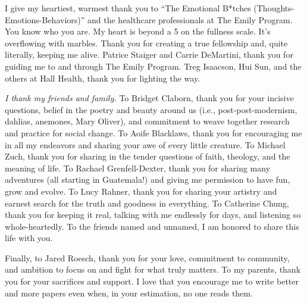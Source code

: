 I give my heartiest, warmest thank you to ``The Emotional B*tches
(Thoughts-Emotions-Behaviors)'' and the healthcare professionals at The Emily Program. You know who you are. 
My heart is beyond a 5 on the fullness scale. It's overflowing with marbles.
Thank you for creating a true fellowship and, quite literally, keeping me
alive. Patrice Staiger and Carrie DeMartini, thank you for guiding me to and
through The Emily Program. Treg Isaacson, Hui Sun, and the others 
at Hall Health, thank you for lighting the way.

\textit{I thank my friends and family.} To Bridget Claborn, thank you for your
incisive questions, belief in the poetry and beauty around us
(i.e., post-post-modernism, dahlias, anemones, Mary Oliver), and commitment to weave together research and practice for social change. %
To Aoife Blacklaws, thank you for encouraging me in all my endeavors and sharing
your awe of every little creature. To Michael Zuch, thank you for sharing in the
tender questions of faith, theology, and the meaning of life. To Rachael
Grenfell-Dexter, thank you for sharing many adventures (all starting in
Guatemala!) and giving me permission to have fun, grow and evolve. To Lucy
Rahner, thank you for sharing your artistry and earnest search for the truth and
goodness in everything. To Catherine Chung, thank you for keeping it real,
talking with me endlessly for days, and listening so whole-heartedly. To the
friends named and unnamed, I am honored to share this life with you. 

Finally, to Jared Roesch, thank you for your love, commitment to community,
and ambition to focus on and fight for what truly matters. To my parents,
thank you for your sacrifices and support. I love that you
encourage me to write better and more papers even when, in your estimation,
no one reads them.

